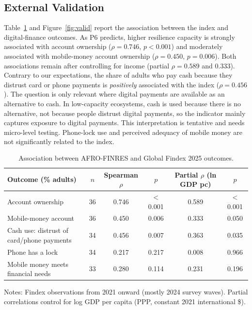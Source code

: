 \documentclass[11pt,a4paper]{article}
\begin{document}
\subsection{External Validation}\label{sec:valid}

Table~\ref{tab:valid} and Figure~\ref{fig:valid} report the association between the index and digital-finance outcomes. As P6 predicts, higher resilience capacity is strongly associated with account ownership ($\rho=0.746$, $p<0.001$) and moderately associated with mobile-money account ownership ($\rho=0.450$, $p=0.006$). Both associations remain after controlling for income (partial $\rho=0.589$ and $0.333$). Contrary to our expectations, the share of adults who pay cash because they distrust card or phone payments is \emph{positively} associated with the index ($\rho=0.456$). The question is only relevant where digital payments are available as an alternative to cash. In low-capacity ecosystems, cash is used because there is no alternative, not because people distrust digital payments, so the indicator mainly captures exposure to digital payments. This interpretation is tentative and needs micro-level testing. Phone-lock use and perceived adequacy of mobile money are not significantly related to the index.

\begin{table}[htbp]
\centering
\caption{Association between AFRO-FINRES and Global Findex 2025 outcomes.}
\label{tab:valid}
\small
\begin{threeparttable}
\begin{tabular}{l c c c c c}
\toprule
Outcome (\% adults) & $n$ & Spearman $\rho$ & $p$ & Partial $\rho$ (ln GDP pc) & $p$ \\
\midrule
Account ownership & 36 & 0.746 & $<$0.001 & 0.589 & $<$0.001 \\
Mobile-money account & 36 & 0.450 & 0.006 & 0.333 & 0.050 \\
Cash use: distrust of card/phone payments & 34 & 0.456 & 0.007 & 0.363 & 0.035 \\
Phone has a lock & 34 & 0.217 & 0.217 & 0.008 & 0.966 \\
Mobile money meets financial needs & 33 & 0.280 & 0.114 & 0.231 & 0.196 \\
\bottomrule
\end{tabular}
\begin{tablenotes}\footnotesize
\item Notes: Findex observations from 2021 onward (mostly 2024 survey waves). Partial correlations control for log GDP per capita (PPP, constant 2021 international \$).
\end{tablenotes}
\end{threeparttable}
\end{table}
\end{document}
